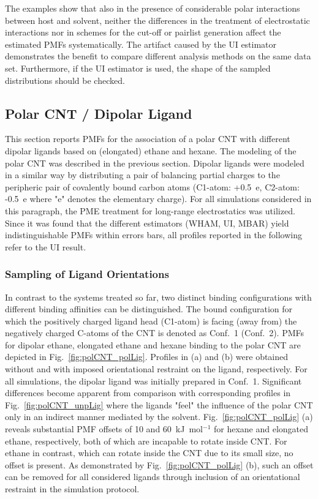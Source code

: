 \documentclass[9pt,lessons]{livecoms}
\begin{document}
The examples show that also in the presence of considerable polar interactions between host and solvent, 
neither the differences in the treatment of electrostatic interactions nor in schemes for the cut-off or pairlist generation affect the estimated PMFs systematically.
The  artifact caused by the UI estimator demonstrates the benefit to compare different analysis methods on the same data set.
Furthermore, if the UI estimator is used, the shape of the sampled distributions should be checked.

\subsection{Polar CNT / Dipolar Ligand}
\label{subsec:pol_host_pol_lig}

This section reports PMFs for the association of a polar CNT with different dipolar ligands based on (elongated) ethane and hexane.
The modeling of the polar CNT was described in the previous section. 
Dipolar ligands were modeled in a similar way by distributing a pair of balancing partial charges  to the peripheric pair of covalently bound carbon atoms 
(C1-atom: +0.5~e, C2-atom: -0.5~e where "e" denotes the elementary charge).
For all simulations considered in this paragraph, the PME treatment for long-range electrostatics was utilized.
Since it was found that the different estimators (WHAM, UI, MBAR) yield indistinguishable PMFs within errors bars, all profiles reported in the following refer to the UI result.

\subsubsection*{Sampling of Ligand Orientations}

In contrast to the systems treated so far, two distinct binding configurations with different binding affinities can be distinguished. 
The bound configuration for which the positively charged ligand head (C1-atom) is facing (away from) the negatively charged C-atoms of the CNT is denoted as Conf.~1 (Conf.~2).
PMFs for dipolar ethane, elongated ethane and hexane binding to the polar CNT are depicted in Fig.~\ref{fig:polCNT_polLig}.  
Profiles in (a) and (b) were obtained without and with imposed orientational restraint on the ligand, respectively.
For all simulations, the dipolar ligand was initially prepared in Conf.~1.
Significant differences become apparent from comparison with corresponding profiles in Fig.~\ref{fig:polCNT_unpLig} where the ligands "feel" the influence of the polar CNT only in an indirect manner mediated by the solvent.
Fig.~\ref{fig:polCNT_polLig} (a) reveals substantial PMF offsets of 10 and 60~kJ~mol$^{-1}$ for hexane and elongated ethane, respectively, both of which are incapable to rotate inside CNT.
For ethane in contrast, which can rotate inside the CNT due to its small size, no offset is present. 
As demonstrated by Fig.~\ref{fig:polCNT_polLig} (b), such an offset can be removed for all considered ligands through inclusion of an orientational restraint in the simulation protocol.
\end{document}
